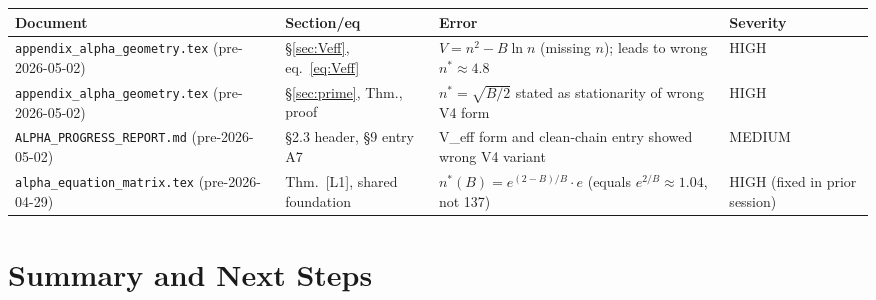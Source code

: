 \documentclass[12pt,a4paper]{article}
\theoremstyle{definition}
\theoremstyle{remark}
\begin{document}
\begin{center}
\renewcommand{\arraystretch}{1.2}
\begin{tabular}{p{4.5cm} p{2.5cm} p{4.5cm} p{2cm}}
\toprule
\textbf{Document} & \textbf{Section/eq} & \textbf{Error} & \textbf{Severity} \\
\midrule
\texttt{appendix\_alpha\_geometry.tex} (pre-2026-05-02)
  & \S\ref{sec:Veff}, eq.\ \eqref{eq:Veff}
  & $V = n^2 - B\ln n$ (missing $n$); leads to wrong $n^* \approx 4.8$
  & HIGH \\
\texttt{appendix\_alpha\_geometry.tex} (pre-2026-05-02)
  & \S\ref{sec:prime}, Thm., proof
  & $n^* = \sqrt{B/2}$ stated as stationarity of wrong V4 form
  & HIGH \\
\texttt{ALPHA\_PROGRESS\_REPORT.md} (pre-2026-05-02)
  & \S2.3 header, \S9 entry A7
  & V\_eff form and clean-chain entry showed wrong V4 variant
  & MEDIUM \\
\texttt{alpha\_equation\_matrix.tex} (pre-2026-04-29)
  & Thm.~[L1], shared foundation
  & $n^*(B) = e^{(2-B)/B}\cdot e$ (equals $e^{2/B}\approx 1.04$, not 137)
  & HIGH (fixed in prior session) \\
\bottomrule
\end{tabular}
\end{center}

\section{Summary and Next Steps}
\label{sec:vc2:summary}
\end{document}
